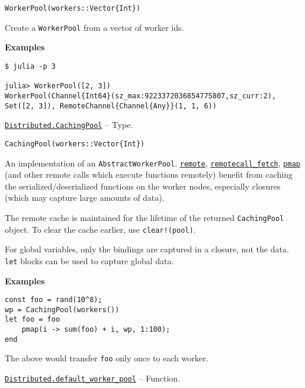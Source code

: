 \begin{adjustwidth}{2em}{0pt}


\begin{verbatim}
WorkerPool(workers::Vector{Int})
\end{verbatim}

Create a \texttt{WorkerPool} from a vector of worker ids.

\textbf{Examples}


\begin{verbatim}
$ julia -p 3

julia> WorkerPool([2, 3])
WorkerPool(Channel{Int64}(sz_max:9223372036854775807,sz_curr:2), Set([2, 3]), RemoteChannel{Channel{Any}}(1, 1, 6))
\end{verbatim}



\end{adjustwidth}
\hypertarget{8617353702639655725}{}
\hyperlink{8617353702639655725}{\texttt{Distributed.CachingPool}}  -- {Type.}

\begin{adjustwidth}{2em}{0pt}


\begin{verbatim}
CachingPool(workers::Vector{Int})
\end{verbatim}

An implementation of an \texttt{AbstractWorkerPool}. \hyperlink{11837735656545549689}{\texttt{remote}}, \hyperlink{17262349333771600150}{\texttt{remotecall\_fetch}}, \hyperlink{9432281416771383761}{\texttt{pmap}} (and other remote calls which execute functions remotely) benefit from caching the serialized/deserialized functions on the worker nodes, especially closures (which may capture large amounts of data).

The remote cache is maintained for the lifetime of the returned \texttt{CachingPool} object. To clear the cache earlier, use \texttt{clear!(pool)}.

For global variables, only the bindings are captured in a closure, not the data. \texttt{let} blocks can be used to capture global data.

\textbf{Examples}


\begin{verbatim}
const foo = rand(10^8);
wp = CachingPool(workers())
let foo = foo
    pmap(i -> sum(foo) + i, wp, 1:100);
end
\end{verbatim}

The above would transfer \texttt{foo} only once to each worker.



\end{adjustwidth}
\hypertarget{994186287326037532}{}
\hyperlink{994186287326037532}{\texttt{Distributed.default\_worker\_pool}}  -- {Function.}

